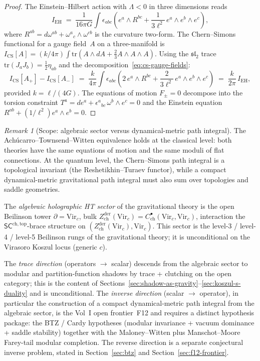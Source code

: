 \documentclass[11pt,reqno]{amsart}
\theoremstyle{definition}
\theoremstyle{remark}
\newtheorem{remark}[theorem]{Remark}
\providecommand{\Vir}{\mathrm{Vir}}
\begin{document}
\begin{proof}
The Einstein--Hilbert action with $\Lambda < 0$ in three dimensions
reads
\[
I_{\mathrm{EH}} \;=\;
\frac{1}{16\pi G}\int
\epsilon_{abc}\left(
  e^a \wedge R^{bc} + \frac{1}{3\ell^2}\,e^a \wedge e^b \wedge e^c
\right),
\]
where $R^{ab} = d\omega^{ab} + \omega^a{}_c \wedge \omega^{cb}$ is
the curvature two-form. The Chern--Simons functional for a gauge
field~$A$ on a three-manifold is
$I_{\mathrm{CS}}[A] = (k/4\pi)\int\mathrm{tr}(A \wedge dA
+ \tfrac{2}{3}A \wedge A \wedge A)$.
Using the $\mathfrak{sl}_2$ trace $\mathrm{tr}(J_a J_b)
= \frac{1}{2}\eta_{ab}$ and the decomposition~\eqref{eq:cs-gauge-fields}:
\begin{equation}\label{eq:cs-eh-identity}
I_{\mathrm{CS}}[A_+] - I_{\mathrm{CS}}[A_-]
\;=\;
\frac{k}{4\pi}\int \epsilon_{abc}\!\left(
  2\,e^a \wedge R^{bc}
  + \frac{2}{3\ell^2}\,e^a \wedge e^b \wedge e^c
\right)
\;=\;
\frac{k}{2\pi}\,I_{\mathrm{EH}},
\end{equation}
provided $k = \ell/(4G)$. The equations of motion
$F_\pm = 0$ decompose into the torsion constraint
$T^a = de^a + \epsilon^a{}_{bc}\,\omega^b \wedge e^c = 0$ and the
Einstein equation $R^{ab} + (1/\ell^2)e^a \wedge e^b = 0$.
\end{proof}

\begin{remark}[Scope: algebraic sector versus dynamical-metric path integral]
\label{rem:scope-algebraic-sector}
The Ach\'ucarro--Townsend--Witten equivalence holds at the classical
level: both theories have the same equations of motion and the same
moduli of flat connections. At the quantum level, the Chern--Simons
path integral is a topological invariant (the Reshetikhin--Turaev
functor), while a compact dynamical-metric gravitational path
integral must also sum over topologies and saddle geometries.

The \emph{algebraic holographic HT sector} of the gravitational theory
is the open Beilinson tower
$\partial = \Vir_c$, bulk
$Z^{\mathrm{der}}_{\mathrm{ch}}(\Vir_c)
=C^\bullet_{\mathrm{ch}}(\Vir_c,\Vir_c)$,
interaction the $\mathsf{SC}^{\mathrm{ch,top}}$-brace structure on
$(Z^{\mathrm{der}}_{\mathrm{ch}}(\Vir_c), \Vir_c)$. This sector is
the level-3 / level-4 / level-5 Beilinson rungs of the gravitational
theory; it is unconditional on the Virasoro Koszul locus (generic
$c$).

The \emph{trace direction} (operators $\to$ scalar) descends from
the algebraic sector to modular and partition-function shadows by
trace + clutching on the open category; this is the content of
Sections~\ref{sec:shadow-as-gravity}--\ref{sec:koszul-s-duality}
and is unconditional. The \emph{inverse direction} (scalar $\to$
operator), in particular the construction of a compact
dynamical-metric path integral from the algebraic sector, is the
Vol~I open frontier~F12 and requires a distinct hypothesis package:
the BTZ / Cardy hypotheses (modular invariance + vacuum dominance +
saddle stability) together with the Maloney--Witten
plus Manschot--Moore Farey-tail modular completion. The reverse
direction is a separate conjectural inverse problem, stated in
Section~\ref{sec:btz} and Section~\ref{sec:f12-frontier}.
\end{remark}
\end{document}
